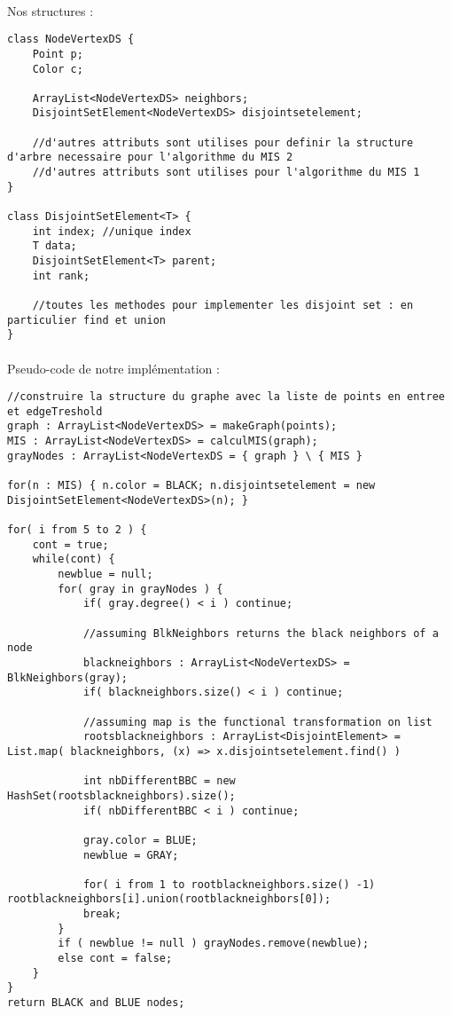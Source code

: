 \paragraph{}
Nos structures :
\begin{lstlisting}
class NodeVertexDS {
	Point p;
	Color c;
	
	ArrayList<NodeVertexDS> neighbors;
	DisjointSetElement<NodeVertexDS> disjointsetelement;
	
	//d'autres attributs sont utilises pour definir la structure d'arbre necessaire pour l'algorithme du MIS 2
	//d'autres attributs sont utilises pour l'algorithme du MIS 1
}

class DisjointSetElement<T> {
	int index; //unique index
	T data;
	DisjointSetElement<T> parent;
	int rank;
	
	//toutes les methodes pour implementer les disjoint set : en particulier find et union
}
\end{lstlisting}

\paragraph{}
Pseudo-code de notre implémentation :

\begin{lstlisting}
//construire la structure du graphe avec la liste de points en entree et edgeTreshold
graph : ArrayList<NodeVertexDS> = makeGraph(points);
MIS : ArrayList<NodeVertexDS> = calculMIS(graph);
grayNodes : ArrayList<NodeVertexDS = { graph } \ { MIS }

for(n : MIS) { n.color = BLACK; n.disjointsetelement = new DisjointSetElement<NodeVertexDS>(n); }

for( i from 5 to 2 ) {
	cont = true;
	while(cont) {
		newblue = null;
		for( gray in grayNodes ) {
			if( gray.degree() < i ) continue;
			
			//assuming BlkNeighbors returns the black neighbors of a node
			blackneighbors : ArrayList<NodeVertexDS> = BlkNeighbors(gray);
			if( blackneighbors.size() < i ) continue;
			
			//assuming map is the functional transformation on list
			rootsblackneighbors : ArrayList<DisjointElement> = List.map( blackneighbors, (x) => x.disjointsetelement.find() )
			
			int nbDifferentBBC = new HashSet(rootsblackneighbors).size();
			if( nbDifferentBBC < i ) continue;
			
			gray.color = BLUE;
			newblue = GRAY;
			
			for( i from 1 to rootblackneighbors.size() -1) rootblackneighbors[i].union(rootblackneighbors[0]);
			break;
		}
		if ( newblue != null ) grayNodes.remove(newblue);
		else cont = false;
	}
}
return BLACK and BLUE nodes;
\end{lstlisting}